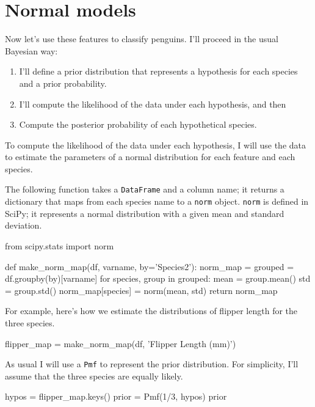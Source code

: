 \documentclass[12pt]{book}
\theoremstyle{exercise}
\newcommand{\py}[1]{{\tt #1}}%
\begin{document}
\section{Normal models}
\label{normal-models}

Now let's use these features to classify penguins. I'll proceed in the
usual Bayesian way:

\begin{enumerate}

\item
  I'll define a prior distribution that represents a hypothesis for each
  species and a prior probability.
\item
  I'll compute the likelihood of the data under each hypothesis, and
  then
\item
  Compute the posterior probability of each hypothetical species.
\end{enumerate}

To compute the likelihood of the data under each hypothesis, I will use
the data to estimate the parameters of a normal distribution for each
feature and each species.

The following function takes a \py{DataFrame} and a
column name; it returns a dictionary that maps from each species name to
a \py{norm} object. \py{norm}
is defined in SciPy; it represents a normal distribution with a given
mean and standard deviation.

\begin{code}
from scipy.stats import norm

def make_norm_map(df, varname, by='Species2'):
    norm_map = {}
    grouped = df.groupby(by)[varname]
    for species, group in grouped:
        mean = group.mean()
        std = group.std()
        norm_map[species] = norm(mean, std)
    return norm_map
\end{code}

For example, here's how we estimate the distributions of flipper length
for the three species.

\begin{code}
flipper_map = make_norm_map(df, 'Flipper Length (mm)')
\end{code}

As usual I will use a \py{Pmf} to represent the
prior distribution. For simplicity, I'll assume that the three species
are equally likely.

\begin{code}
hypos = flipper_map.keys()
prior = Pmf(1/3, hypos)
prior
\end{code}
\end{document}
